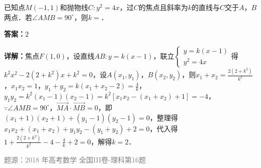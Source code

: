 \begin{question}
已知点$M(-1,1)$和抛物线$C:y^2=4x$，过$C$的焦点且斜率为$k$的直线与$C$交于$A$，$B$两点．若$\angle AMB=90^\circ$，则$k=$\underline{\hspace{3cm}}．
\begin{solution}
\textbf{答案：}$2$

\textbf{详解：}焦点$F(1,0)$，设直线$AB:y=k(x-1)$，联立$\begin{cases}y=k(x-1)\\y^2=4x\end{cases}$得$k^2x^2-2(2+k^2)x+k^2=0$，设$A(x_1,y_1)$，$B(x_2,y_2)$，则$x_1+x_2=\frac{2(2+k^2)}{k^2}$，$x_1x_2=1$，$y_1+y_2=k(x_1+x_2-2)=\frac{4}{k}$，$y_1y_2=k^2(x_1-1)(x_2-1)=k^2[x_1x_2-(x_1+x_2)+1]=-4$，$\because \angle AMB=90^\circ$，$\overrightarrow{MA}\cdot\overrightarrow{MB}=0$，即$(x_1+1)(x_2+1)+(y_1-1)(y_2-1)=0$，整理得$x_1x_2+(x_1+x_2)+y_1y_2-(y_1+y_2)+2=0$，代入得$1+\frac{2(2+k^2)}{k^2}-4-\frac{4}{k}+2=0$，解得$k=2$．

\textcolor{gray}{\footnotesize 题源：2018 年高考数学 全国III卷-理科第16题}
\end{solution}
\end{question}


